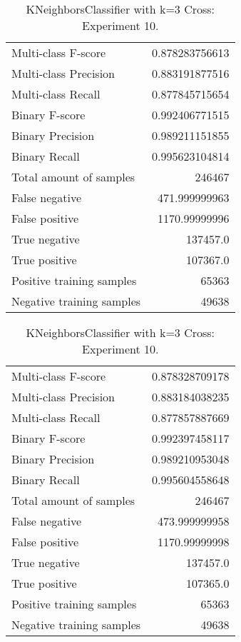 \begin{table}[H]
\begin{minipage}{0.5\textwidth}
\caption{KNeighborsClassifier with k=3 Cross: Experiment 9.}
\centering
\begin{tabular}{l r}
\toprule
Multi-class F-score & 0.878283756613 \\
Multi-class Precision & 0.883191877516 \\
Multi-class Recall & 0.877845715654 \\
\midrule
Binary F-score & 0.992406771515 \\
Binary Precision & 0.989211151855 \\
Binary Recall & 0.995623104814 \\
\midrule
Total amount of samples & 246467 \\
False negative & 471.999999963 \\
False positive & 1170.99999996 \\
True negative & 137457.0 \\
True positive & 107367.0 \\
\midrule
Positive training samples & 65363 \\
Negative training samples & 49638 \\
\bottomrule
\end{tabular}
\end{minipage}
\hfillx
\begin{minipage}{0.5\textwidth}
\caption{KNeighborsClassifier with k=3 Cross: Experiment 10.}
\centering
\begin{tabular}{l r}
\toprule
Multi-class F-score & 0.878328709178 \\
Multi-class Precision & 0.883184038235 \\
Multi-class Recall & 0.877857887669 \\
\midrule
Binary F-score & 0.992397458117 \\
Binary Precision & 0.989210953048 \\
Binary Recall & 0.995604558648 \\
\midrule
Total amount of samples & 246467 \\
False negative & 473.999999958 \\
False positive & 1170.99999998 \\
True negative & 137457.0 \\
True positive & 107365.0 \\
\midrule
Positive training samples & 65363 \\
Negative training samples & 49638 \\
\bottomrule
\end{tabular}
\end{minipage}
\end{table}
